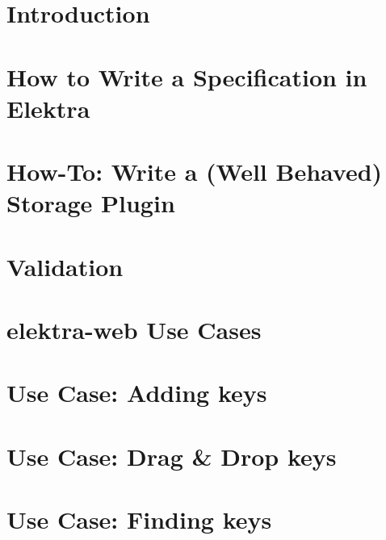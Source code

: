 \let\mypdfximage\pdfximage\def\pdfximage{\immediate\mypdfximage}\documentclass[twoside]{book}
\newcommand{\+}{\discretionary{\mbox{\scriptsize$\hookleftarrow$}}{}{}}
\begin{document}
\chapter{Introduction}
\label{doc_tutorials_run_reformatting_script_with_docker_md}

\chapter{How to Write a Specification in Elektra}
\label{doc_tutorials_specification_md}

\chapter{How-\/\+To\+: Write a (Well Behaved) Storage Plugin}
\label{doc_tutorials_storage-plugins_md}

\chapter{Validation}
\label{doc_tutorials_validation_md}

\chapter{elektra-\/web Use Cases}
\label{doc_usecases_elektra_web_README_md}

\chapter{Use Case\+: Adding keys}
\label{doc_usecases_elektra_web_UC_adding_keys_md}

\chapter{Use Case\+: Drag \& Drop keys}
\label{doc_usecases_elektra_web_UC_drag_n_drop_md}

\chapter{Use Case\+: Finding keys}
\label{doc_usecases_elektra_web_UC_finding_keys_md}

\end{document}
